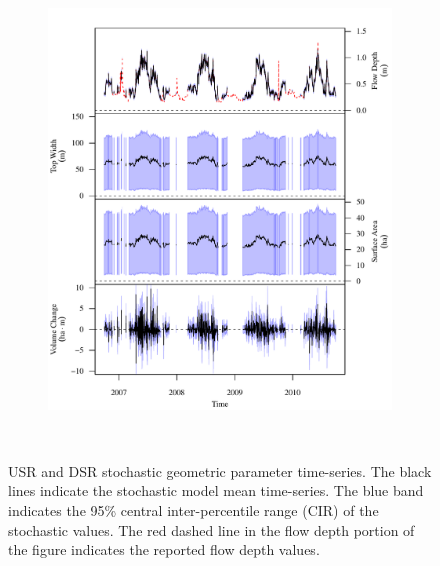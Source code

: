 \begin{linenumbers}
\begin{landscape}
\begin{figure}
\begin{subfigure}{0.7\textwidth}
			\includegraphics[width=\tableCustomSize]{"Figures/Results_USR/Stochastic/G TS B"}
			\label{sub:GeoTS_B}
		\end{subfigure}\\
	\caption[USR and DSR stochastic geometric parameter time-series.]{USR and DSR stochastic geometric parameter time-series. The black lines indicate the stochastic model mean time-series.  The blue band indicates the 95\% central inter-percentile range (CIR) of the stochastic values.  The red dashed line in the flow depth portion of the figure indicates the reported flow depth values.}
	\label{fig:GeoTS_US}
	\end{figure}
\end{landscape}


\end{linenumbers}

